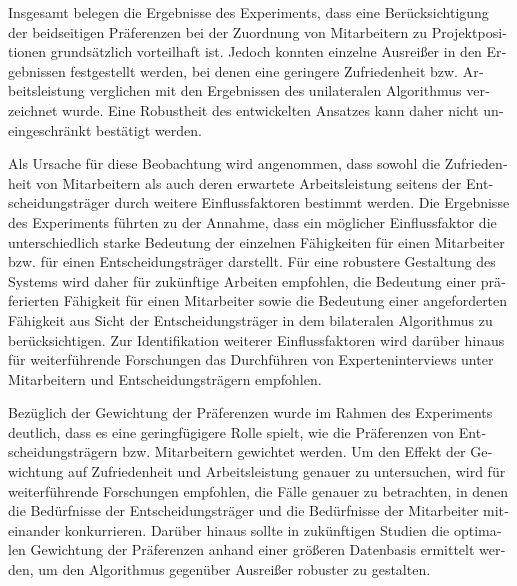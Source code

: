 \begin{otherlanguage}{ngerman}
Insgesamt belegen die Ergebnisse des Experiments, dass eine Berücksichtigung der beidseitigen Präferenzen bei der Zuordnung von Mitarbeitern zu Projektpositionen grundsätzlich vorteilhaft ist.
Jedoch konnten einzelne Ausreißer in den Ergebnissen festgestellt werden, bei denen eine geringere Zufriedenheit bzw. Arbeitsleistung verglichen mit den Ergebnissen des unilateralen Algorithmus verzeichnet wurde.
Eine Robustheit des entwickelten Ansatzes kann daher nicht uneingeschränkt bestätigt werden.

Als Ursache für diese Beobachtung wird angenommen, dass sowohl die Zufriedenheit von Mitarbeitern als auch deren erwartete Arbeitsleistung seitens der Entscheidungsträger durch weitere Einflussfaktoren bestimmt werden.
Die Ergebnisse des Experiments führten zu der Annahme, dass ein möglicher Einflussfaktor die unterschiedlich starke Bedeutung der einzelnen Fähigkeiten für einen Mitarbeiter bzw. für einen Entscheidungsträger darstellt.
Für eine robustere Gestaltung des Systems wird daher für zukünftige Arbeiten empfohlen, die Bedeutung einer präferierten Fähigkeit für einen Mitarbeiter sowie die Bedeutung einer angeforderten Fähigkeit aus Sicht der Entscheidungsträger in dem bilateralen Algorithmus zu berücksichtigen.
Zur Identifikation weiterer Einflussfaktoren wird darüber hinaus für weiterführende Forschungen das Durchführen von Experteninterviews unter Mitarbeitern und Entscheidungsträgern empfohlen.

Bezüglich der Gewichtung der Präferenzen wurde im Rahmen des Experiments deutlich, dass es eine geringfügigere Rolle spielt, wie die Präferenzen von Entscheidungsträgern bzw. Mitarbeitern gewichtet werden.
Um den Effekt der Gewichtung auf Zufriedenheit und Arbeitsleistung genauer zu untersuchen, wird für weiterführende Forschungen empfohlen, die Fälle genauer zu betrachten, in denen die Bedürfnisse der Entscheidungsträger und die Bedürfnisse der Mitarbeiter miteinander konkurrieren.
Darüber hinaus sollte in zukünftigen Studien die optimalen Gewichtung der Präferenzen anhand einer größeren Datenbasis ermittelt werden, um den Algorithmus gegenüber Ausreißer robuster zu gestalten.

\end{otherlanguage}
